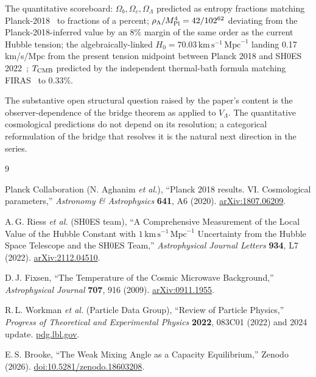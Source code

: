 \documentclass[11pt]{article}
\newcommand{\Mpl}{M_{\rm Pl}}
\begin{document}
The quantitative scoreboard: $\Omega_b, \Omega_c, \Omega_\Lambda$ predicted as entropy fractions matching Planck-2018~\cite{Planck2018} to fractions of a percent; $\rho_\Lambda/\Mpl^4 = 42/102^{62}$ deviating from the Planck-2018-inferred value by an 8\% margin of the same order as the current Hubble tension; the algebraically-linked $H_0 = 70.03\,\mathrm{km}\,\mathrm{s}^{-1}\,\mathrm{Mpc}^{-1}$ landing 0.17 km/s/Mpc from the present tension midpoint between Planck 2018 and SH0ES 2022~\cite{Riess2022}; $T_{\rm CMB}$ predicted by the independent thermal-bath formula matching FIRAS~\cite{Fixsen2009} to 0.33\%.

The substantive open structural question raised by the paper's content is the observer-dependence of the bridge theorem as applied to $V_\Lambda$. The quantitative cosmological predictions do not depend on its resolution; a categorical reformulation of the bridge that resolves it is the natural next direction in the series.

\begin{thebibliography}{9}

Planck Collaboration (N. Aghanim \textit{et al.}),
``Planck 2018 results. VI. Cosmological parameters,''
\textit{Astronomy \& Astrophysics} \textbf{641}, A6 (2020).
\href{https://arxiv.org/abs/1807.06209}{arXiv:1807.06209}.

A.\,G. Riess \textit{et al.} (SH0ES team),
``A Comprehensive Measurement of the Local Value of the Hubble Constant with $1\,\mathrm{km}\,\mathrm{s}^{-1}\,\mathrm{Mpc}^{-1}$ Uncertainty from the Hubble Space Telescope and the SH0ES Team,''
\textit{Astrophysical Journal Letters} \textbf{934}, L7 (2022).
\href{https://arxiv.org/abs/2112.04510}{arXiv:2112.04510}.

D.\,J. Fixsen,
``The Temperature of the Cosmic Microwave Background,''
\textit{Astrophysical Journal} \textbf{707}, 916 (2009).
\href{https://arxiv.org/abs/0911.1955}{arXiv:0911.1955}.

R.\,L. Workman \textit{et al.} (Particle Data Group),
``Review of Particle Physics,''
\textit{Progress of Theoretical and Experimental Physics} \textbf{2022}, 083C01 (2022) and 2024 update.
\href{https://pdg.lbl.gov}{pdg.lbl.gov}.

E.\,S. Brooke,
``The Weak Mixing Angle as a Capacity Equilibrium,''
Zenodo (2026).
\href{https://doi.org/10.5281/zenodo.18603208}{doi:10.5281/zenodo.18603208}.

\end{thebibliography}
\end{document}
